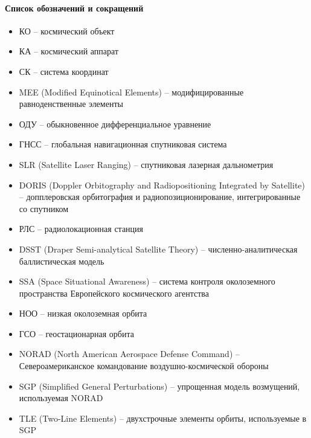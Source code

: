 \paragraph{Список обозначений и сокращений}

\begin{itemize}
    \item КО -- космический объект
    \item КА -- космический аппарат
    \item СК -- система координат
    \item MEE (Modified Equinotical Elements) -- модифицированные равноденственные элементы
    \item ОДУ -- обыкновенное дифференциальное уравнение
    \item ГНСС -- глобальная навигационная спутниковая система
    \item SLR (Satellite Laser Ranging) -- спутниковая лазерная дальнометрия
    \item DORIS (Doppler Orbitography and Radiopositioning Integrated by Satellite) -- допплеровская орбитография и радиопозиционирование, интегрированные со спутником
    \item РЛС -- радиолокационная станция
    \item DSST (Draper Semi-analytical Satellite Theory) -- численно-аналитическая баллистическая модель
    \item SSA (Space Situational Awareness) -- система контроля околоземного пространства Европейского космического агентства
    \item НОО -- низкая околоземная орбита
    \item ГСО -- геостационарная орбита
    \item NORAD (North American Aerospace Defense Command) -- Североамериканское командование воздушно-космической обороны
    \item SGP (Simplified General Perturbations) -- упрощенная модель возмущений, используемая NORAD
    \item TLE (Two-Line Elements) -- двухстрочные элементы орбиты, используемые в SGP
\end{itemize}

\newpage